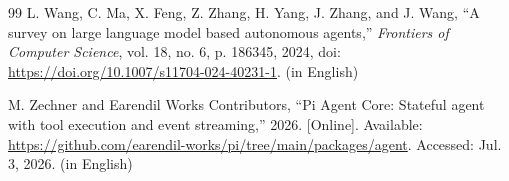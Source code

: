 \begin{thebibliography}{99}
L. Wang, C. Ma, X. Feng, Z. Zhang, H. Yang, J. Zhang, and J. Wang, ``A survey on large language model based autonomous agents,'' \emph{Frontiers of Computer Science}, vol. 18, no. 6, p. 186345, 2024, doi: \url{https://doi.org/10.1007/s11704-024-40231-1}. (in English)

M. Zechner and Earendil Works Contributors, ``Pi Agent Core: Stateful agent with tool execution and event streaming,'' 2026. [Online]. Available: \url{https://github.com/earendil-works/pi/tree/main/packages/agent}. Accessed: Jul. 3, 2026. (in English)

\end{thebibliography}
